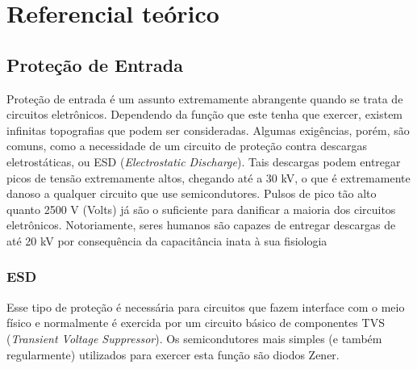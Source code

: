 \chapter{Referencial te\'orico}\label{cap:referencialTeorico}


\section{Proteção de Entrada}\label{sec:InputProtection}

Proteção de entrada é um assunto extremamente abrangente quando se trata de circuitos eletrônicos. Dependendo da função que este tenha que exercer, existem infinitas topografias que podem ser consideradas. Algumas exigências, porém, são comuns, como a necessidade de um circuito de proteção contra descargas eletrostáticas, ou \gls{ESD} (\textit{Electrostatic Discharge}). Tais descargas podem entregar picos de tensão extremamente altos, chegando até a 30 kV, o que é extremamente danoso a qualquer circuito que use semicondutores. Pulsos de pico tão alto quanto 2500 V (Volts) já são o suficiente para danificar a maioria dos circuitos eletrônicos. Notoriamente, seres humanos são capazes de entregar descargas de até 20 kV por consequência da capacitância inata à sua fisiologia %

    \subsection{ESD}\label{subsec:electrostaticDischarge}
    Esse tipo de proteção é necessária para circuitos que fazem interface com o meio físico e normalmente é exercida por um circuito básico de componentes \gls{TVS} (\textit{Transient Voltage Suppressor}). Os semicondutores mais simples (e também regularmente) utilizados para exercer esta função são diodos Zener.
    
